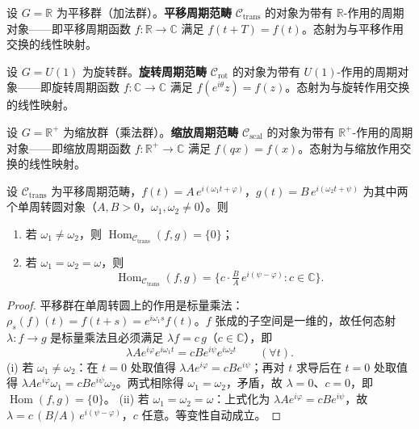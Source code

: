 \begin{definition}[平移周期范畴]\label{def:translation_periodic_category}
设 $G = \mathbb{R}$ 为平移群（加法群）。\textbf{平移周期范畴} $\mathcal{C}_{\text{trans}}$ 的对象为带有 $\mathbb{R}$-作用的周期对象——即平移周期函数 $f: \mathbb{R} \to \mathbb{C}$ 满足 $f(t+T) = f(t)$。态射为与平移作用交换的线性映射。
\end{definition}

\begin{definition}[旋转周期范畴]\label{def:rotation_periodic_category}
设 $G = U(1)$ 为旋转群。\textbf{旋转周期范畴} $\mathcal{C}_{\text{rot}}$ 的对象为带有 $U(1)$-作用的周期对象——即旋转周期函数 $f: \mathbb{C} \to \mathbb{C}$ 满足 $f(e^{i\theta}z) = f(z)$。态射为与旋转作用交换的线性映射。
\end{definition}

\begin{definition}[缩放周期范畴]\label{def:scaling_periodic_category}
设 $G = \mathbb{R}^+$ 为缩放群（乘法群）。\textbf{缩放周期范畴} $\mathcal{C}_{\text{scal}}$ 的对象为带有 $\mathbb{R}^+$-作用的周期对象——即缩放周期函数 $f: \mathbb{R}^+ \to \mathbb{C}$ 满足 $f(qx) = f(x)$。态射为与缩放作用交换的线性映射。
\end{definition}

\begin{lemma}[单周转圆对象之间的态射]\label{ch13_hom_frequency_lemma}
设 $\mathcal{C}_{\text{trans}}$ 为平移周期范畴，$f(t) = A\, e^{i(\omega_1 t + \varphi)}$，$g(t) = B\, e^{i(\omega_2 t + \psi)}$ 为其中两个单周转圆对象（$A, B > 0$，$\omega_1, \omega_2 \neq 0$）。则
\begin{enumerate}[label=(\roman*)]
    \item 若 $\omega_1 \neq \omega_2$，则 $\operatorname{Hom}_{\mathcal{C}_{\text{trans}}}(f, g) = \{0\}$；
    \item 若 $\omega_1 = \omega_2 = \omega$，则
    \[
    \operatorname{Hom}_{\mathcal{C}_{\text{trans}}}(f, g) = \Big\{ c \cdot \tfrac{B}{A}\, e^{i(\psi - \varphi)} : c \in \mathbb{C} \Big\}.
    \]
\end{enumerate}
\end{lemma}

\begin{proof}
平移群在单周转圆上的作用是标量乘法：$\rho_s(f)(t) = f(t+s) = e^{i\omega_1 s} f(t)$。$f$ 张成的子空间是一维的，故任何态射 $\lambda: f \to g$ 是标量乘法且必须满足 $\lambda f = c\, g$（$c \in \mathbb{C}$），即
\[
\lambda A e^{i\varphi} e^{i\omega_1 t} = c B e^{i\psi} e^{i\omega_2 t} \qquad (\forall t).
\]
(i) 若 $\omega_1 \neq \omega_2$：在 $t = 0$ 处取值得 $\lambda A e^{i\varphi} = c B e^{i\psi}$；再对 $t$ 求导后在 $t = 0$ 处取值得 $\lambda A e^{i\varphi} \omega_1 = c B e^{i\psi} \omega_2$。两式相除得 $\omega_1 = \omega_2$，矛盾，故 $\lambda = 0$、$c = 0$，即 $\operatorname{Hom}(f, g) = \{0\}$。
(ii) 若 $\omega_1 = \omega_2 = \omega$：上式化为 $\lambda A e^{i\varphi} = c B e^{i\psi}$，故 $\lambda = c\,(B/A)\,e^{i(\psi-\varphi)}$，$c$ 任意。等变性自动成立。
\end{proof}

